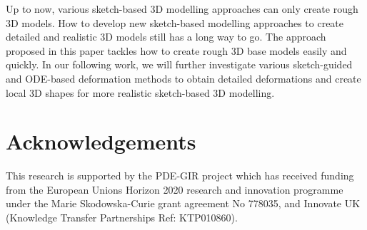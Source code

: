 \documentclass[runningheads]{llncs}
\begin{document}
Up to now, various sketch-based 3D modelling approaches can only create rough 3D models. How to develop new sketch-based modelling approaches to create detailed and realistic 3D models still has a long way to go. The approach proposed in this paper tackles how to create rough 3D base models easily and quickly. In our following work, we will further investigate various sketch-guided and ODE-based deformation methods to obtain detailed deformations and create local 3D shapes for more realistic sketch-based 3D modelling. 

\section{Acknowledgements}\label{Acknowledgements}
This research is supported by the PDE-GIR project which has received funding from the European Unions Horizon 2020 research and innovation programme under the Marie Skodowska-Curie grant agreement No 778035, and Innovate UK (Knowledge Transfer Partnerships Ref: KTP010860).

%
%
%
 
 
%
\end{document}
